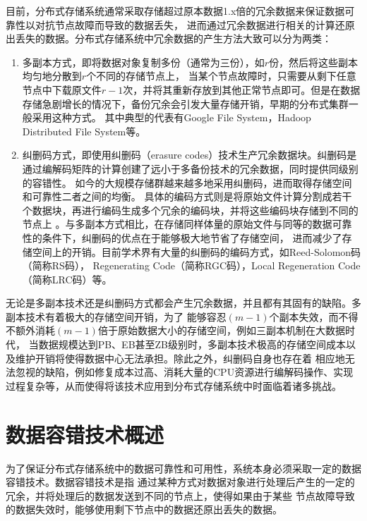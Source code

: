 目前，分布式存储系统通常采取存储超过原本数据1.x倍的冗余数据来保证数据可靠性以对抗节点故障而导致的数据丢失，
进而通过冗余数据进行相关的计算还原出丢失的数据。分布式存储系统中冗余数据的产生方法大致可以分为两类：
\begin{enumerate}
	\item 多副本方式，即将数据对象复制多份（通常为三份），如$r$份，然后将这些副本均匀地分散到$r$个不同的存储节点上，
	      当某个节点故障时，只需要从剩下任意节点中下载原文件$r-1$次，并将其重新存放到其他正常节点即可。但是在数据存储急剧增长的情况下，备份冗余会引发大量存储开销，早期的分布式集群一般采用这种方式。
	      其中典型的代表有Google File System\cite{ghemawat2003google}，Hadoop Distributed File System\cite{borthakur2008hdfs}等。
	\item 纠删码方式，即使用纠删码（erasure codes）技术生产冗余数据块。纠删码是通过编解码矩阵的计算创建了远小于多备份技术的冗余数据，同时提供同级别的容错性\cite{weatherspoon2002erasure}。
	      如今的大规模存储群越来越多地采用纠删码\citep{ford2010availability,huang2012erasure,muralidhar2014f4,ovsiannikov2013quantcast}，进而取得存储空间和可靠性二者之间的均衡。
	      具体的编码方式则是将原始文件计算分割成若干个数据块，再进行编码生成多个冗余的编码块，并将这些编码块存储到不同的节点上
	      。与多副本方式相比，在存储同样体量的原始文件与同等的数据可靠性的条件下，纠删码的优点在于能够极大地节省了存储空间，
	      进而减少了存储空间上的开销。目前学术界有大量的纠删码的编码方式，如Reed-Solomon码（简称RS码）\cite{reed1960polynomial}，
	      Regenerating Code（简称RGC码）\cite{wu2009reducing}，Local Regeneration Code（简称LRC码）\cite{kamath2014codes}等。
\end{enumerate}

无论是多副本技术还是纠删码方式都会产生冗余数据，并且都有其固有的缺陷。多副本技术有着极大的存储空间开销，为了
能够容忍$(m-1)$个副本失效，而不得不额外消耗$(m-1)$倍于原始数据大小的存储空间，例如三副本机制在大数据时代，
当数据规模达到PB、EB甚至ZB级别时，多副本技术极高的存储空间成本以及维护开销将使得数据中心无法承担。除此之外，纠删码自身也存在着
相应地无法忽视的缺陷，例如修复成本过高、消耗大量的CPU资源进行编解码操作、实现过程复杂等，从而使得将该技术应用到分布式存储系统中时面临着诸多挑战。

\section{数据容错技术概述}
为了保证分布式存储系统中的数据可靠性和可用性，系统本身必须采取一定的数据容错技术。数据容错技术是指
通过某种方式对数据对象进行处理后产生的一定的冗余，并将处理后的数据发送到不同的节点上，使得如果由于某些
节点故障导致的数据失效时，能够使用剩下节点中的数据还原出丢失的数据。

